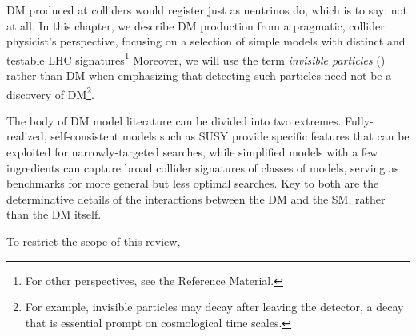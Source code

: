 DM produced at colliders would register just as neutrinos do, which is to say: not at all. 
In this chapter, we describe DM production from a pragmatic, collider physicist's perspective, focusing on a selection of simple models with distinct and testable LHC signatures\footnote{For other perspectives, see the Reference Material.} 
Moreover, we will use the term {\it invisible particles} (\IP) rather than DM when emphasizing that detecting such particles need not be a discovery of DM\footnote{For example, invisible particles may decay after leaving the detector, a decay that is essential prompt on cosmological time scales.}.


The body of DM model literature can be divided into two extremes. %
Fully-realized, self-consistent models such as SUSY provide specific features that can be exploited for narrowly-targeted searches, while simplified models with a few ingredients can capture broad collider signatures of classes of models, serving as benchmarks for more general but less optimal searches.
Key to both are the determinative details of the interactions between the DM and the SM, rather than the DM itself.


To restrict the scope of this review,


